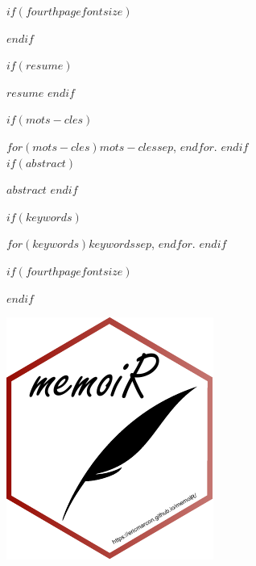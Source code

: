 \documentclass[
  $if(fontsize)$$fontsize$,$endif$
  $if(lang)$$babel-lang$,$endif$
  $if(papersize)$$papersize$paper,$endif$
  $for(classoption)$$classoption$$sep$,$endfor$
  ]{$documentclass$}
\begin{document}
$if(fourthpagefontsize)$
\begin{$fourthpagefontsize$}
$endif$

\begin{description}

$if(resume)$
\item[Résumé:]
$resume$
$endif$

$if(mots-cles)$
\item[Mots clés :]
$for(mots-cles)$$mots-cles$$sep$, $endfor$.
$endif$
~\\

$if(abstract)$
\item[Abstract:]
$abstract$
$endif$

$if(keywords)$
\item[Keywords:]
$for(keywords)$$keywords$$sep$, $endfor$.
$endif$

\end{description}

$if(fourthpagefontsize)$
\end{$fourthpagefontsize$}
$endif$

\vspace*{\fill}
\centering\includegraphics[width=.3\textwidth]{images/logo}
\end{document}
